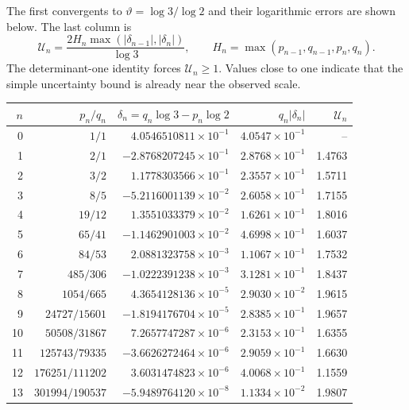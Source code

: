 \documentclass[11pt,oneside]{article}
\theoremstyle{definition}
\theoremstyle{remark}
\newcommand{\thetaAE}{\vartheta}
\begin{document}
The first convergents to $\thetaAE=\log3/\log2$ and their logarithmic errors are shown below.
The last column is
\begin{equation}
 \mathcal U_n=
 \frac{2H_n\max(|\delta_{n-1}|,|\delta_n|)}{\log3},
 \qquad
 H_n=\max(p_{n-1},q_{n-1},p_n,q_n).
 \label{eq:uncertainty-ratio}
\end{equation}
The determinant-one identity forces $\mathcal U_n\ge1$.  Values close to one indicate that the
simple uncertainty bound is already near the observed scale.

\begin{center}
\small
\begin{tabular}{r r r r r}
\toprule
$n$ & $p_n/q_n$ & $\delta_n=q_n\log3-p_n\log2$ & $q_n|\delta_n|$ & $\mathcal U_n$ \\
\midrule
0  & $1/1$          & $ 4.0546510811\!\times10^{-1}$ & $4.0547\!\times10^{-1}$ & -- \\
1  & $2/1$          & $-2.8768207245\!\times10^{-1}$ & $2.8768\!\times10^{-1}$ & 1.4763 \\
2  & $3/2$          & $ 1.1778303566\!\times10^{-1}$ & $2.3557\!\times10^{-1}$ & 1.5711 \\
3  & $8/5$          & $-5.2116001139\!\times10^{-2}$ & $2.6058\!\times10^{-1}$ & 1.7155 \\
4  & $19/12$        & $ 1.3551033379\!\times10^{-2}$ & $1.6261\!\times10^{-1}$ & 1.8016 \\
5  & $65/41$        & $-1.1462901003\!\times10^{-2}$ & $4.6998\!\times10^{-1}$ & 1.6037 \\
6  & $84/53$        & $ 2.0881323758\!\times10^{-3}$ & $1.1067\!\times10^{-1}$ & 1.7532 \\
7  & $485/306$      & $-1.0222391238\!\times10^{-3}$ & $3.1281\!\times10^{-1}$ & 1.8437 \\
8  & $1054/665$     & $ 4.3654128136\!\times10^{-5}$ & $2.9030\!\times10^{-2}$ & 1.9615 \\
9  & $24727/15601$  & $-1.8194176704\!\times10^{-5}$ & $2.8385\!\times10^{-1}$ & 1.9657 \\
10 & $50508/31867$  & $ 7.2657747287\!\times10^{-6}$ & $2.3153\!\times10^{-1}$ & 1.6355 \\
11 & $125743/79335$ & $-3.6626272464\!\times10^{-6}$ & $2.9059\!\times10^{-1}$ & 1.6630 \\
12 & $176251/111202$& $ 3.6031474823\!\times10^{-6}$ & $4.0068\!\times10^{-1}$ & 1.1559 \\
13 & $301994/190537$& $-5.9489764120\!\times10^{-8}$ & $1.1334\!\times10^{-2}$ & 1.9807 \\
\bottomrule
\end{tabular}
\end{center}
\end{document}
